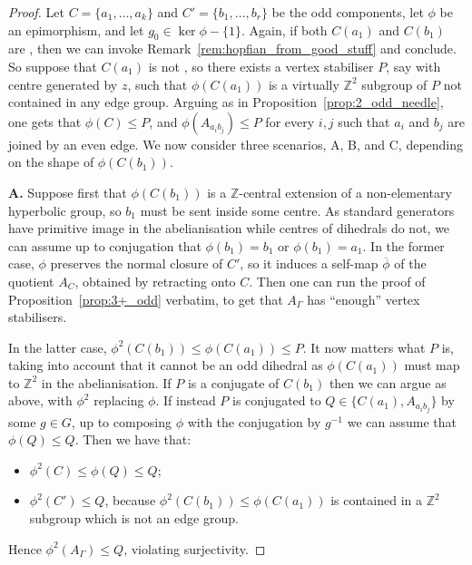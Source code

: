 \documentclass[svgnames]{amsart}
\theoremstyle{plain}
\theoremstyle{definition}
\newcommand{\Z}{\mathbb{Z}}
\newcommand{\ov}[1]{\overline{#1}}
\begin{document}
\begin{proof}
    Let $C=\{a_1,\ldots, a_k\}$ and $C'=\{b_1,\ldots, b_r\}$ be the odd components, let $\phi$ be an epimorphism, and let $g_0\in\ker\phi-\{1\}$. Again, if both $C(a_1)$ and $C(b_1)$ are \good{}, then we can invoke Remark~\ref{rem:hopfian_from_good_stuff} and conclude. So suppose that $C(a_1)$ is not \good{}, so there exists a vertex stabiliser $P$, say with centre generated by $z$, such that $\phi(C(a_1))$ is a virtually $\Z^2$ subgroup of $P$ not contained in any edge group. Arguing as in Proposition~\ref{prop:2_odd_needle}, one gets that $\phi(C)\le P$, and $\phi(A_{a_ib_j})\le P$ for every $i,j$ such that $a_i$ and $b_j$ are joined by an even edge. We now consider three scenarios, A, B, and C, depending on the shape of $\phi(C(b_1))$. 
    \par\medskip
    \textbf{A.}
    Suppose first that $\phi(C(b_1))$ is a $\Z$-central extension of a non-elementary hyperbolic group, so $b_1$ must be sent inside some centre. As standard generators have primitive image in the abelianisation while centres of dihedrals do not, we can assume up to conjugation that $\phi(b_1)=b_1$ or $\phi(b_1)=a_1$. In the former case, $\phi$ preserves the normal closure of $C'$, so it induces a self-map $\ov\phi$ of the quotient $A_C$, obtained by retracting onto $C$. Then one can run the proof of Proposition~\ref{prop:3+_odd} verbatim, to get that $A_\Gamma$ has “enough” \good{} vertex stabilisers. 
\par\medskip

    In the latter case, $\phi^2(C(b_1))\le \phi(C(a_1))\le P$. It now matters what $P$ is, taking into account that it cannot be an odd dihedral as $\phi(C(a_1))$ must map to $\Z^2$ in the abelianisation. If $P$ is a conjugate of $C(b_1)$ then we can argue as above, with $\phi^2$ replacing $\phi$. If instead $P$ is conjugated to $Q\in\{C(a_1),A_{a_ib_j}\}$ by some $g\in G$, up to composing $\phi$ with the conjugation by $g^{-1}$ we can assume that $\phi(Q)\le Q$. Then we have that:
    \begin{itemize}
        \item $\phi^2(C)\le \phi(Q)\le Q$;
        \item $\phi^2(C')\le Q$, because $\phi^2(C(b_1))\le \phi(C(a_1))$ is contained in a $\Z^2$ subgroup which is not an edge group. 
    \end{itemize}
    Hence $\phi^2(A_\Gamma)\le Q$, violating surjectivity.


\end{proof}
\end{document}

